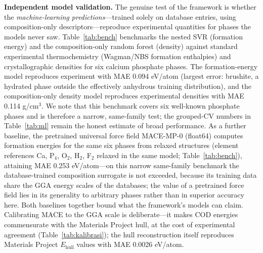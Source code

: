 \documentclass[11pt,a4paper]{article}
\begin{document}
\textbf{Independent model validation.} The genuine test of the framework is whether the \emph{machine-learning predictions}---trained solely on database entries, using composition-only descriptors---reproduce experimental quantities for phases the models never saw. Table~\ref{tab:bench} benchmarks the nested SVR (formation energy) and the composition-only random forest (density) against standard experimental thermochemistry (Wagman/NBS formation enthalpies) and crystallographic densities for six calcium phosphate phases. The formation-energy model reproduces experiment with MAE 0.094 eV/atom (largest error: brushite, a hydrated phase outside the effectively anhydrous training distribution), and the composition-only density model reproduces experimental densities with MAE 0.114 g/cm$^3$. We note that this benchmark covers six well-known phosphate phases and is therefore a narrow, same-family test; the grouped-CV numbers in Table~\ref{tab:ml} remain the honest estimate of broad performance. As a further baseline, the pretrained universal force field MACE-MP-0 (float64) computes formation energies for the same six phases from relaxed structures (element references Ca, P$_4$, O$_2$, H$_2$, F$_2$ relaxed in the same model; Table~\ref{tab:bench}), attaining MAE 0.253 eV/atom---on this narrow same-family benchmark the database-trained composition surrogate is not exceeded, because its training data share the GGA energy scales of the databases; the value of a pretrained force field lies in its generality to arbitrary phases rather than in superior accuracy here. Both baselines together bound what the framework's models can claim. Calibrating MACE to the GGA scale is deliberate---it makes COD energies commensurate with the Materials Project hull, at the cost of experimental agreement (Table~\ref{tab:kalibrasi}); the hull reconstruction itself reproduces Materials Project $E_\mathrm{hull}$ values with MAE 0.0026 eV/atom.
\end{document}
